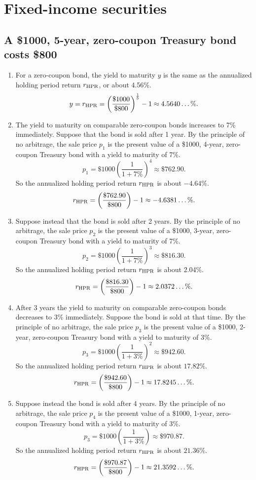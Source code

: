 \documentclass[12pt]{article}
\begin{document}
\section{Fixed-income securities}
\subsection{A \$1000, 5-year, zero-coupon Treasury bond costs \$800}
\begin{enumerate}
\item For a zero-coupon bond, the yield to maturity $y$ is the same as the annualized holding period return $r_{\rm HPR}$, or about 4.56\%. \[y=r_{\rm HPR}=\left(\frac{\$1000}{\$800}\right)^{\frac{1}{5}}-1\approx 4.5640\dots\%.\]
\item The yield to maturity on comparable zero-coupon bonds increases to 7\% immediately. Suppose that the bond is sold after 1 year. By the principle of no arbitrage, the sale price $p_1$ is the present value of a \$1000, 4-year, zero-coupon Treasury bond with a yield to maturity of 7\%. \[p_1=\$1000\left(\frac{1}{1+7\%}\right)^4\approx\$762.90.\] So the annualized holding period return $r_{\rm HPR}$ is about $-4.64\%$. \[r_{\rm HPR}=\left(\frac{\$762.90}{\$800}\right)-1\approx-4.6381\dots\%.\]
\item Suppose instead that the bond is sold after 2 years. By the principle of no arbitrage, the sale price $p_2$ is the present value of a \$1000, 3-year, zero-coupon Treasury bond with a yield to maturity of 7\%. \[p_2=\$1000\left(\frac{1}{1+7\%}\right)^3\approx\$816.30.\] So the annualized holding period return $r_{\rm HPR}$ is about 2.04\%. \[r_{\rm HPR}=\left(\frac{\$816.30}{\$800}\right)-1\approx 2.0372\dots\%.\]
\item After 3 years the yield to maturity on comparable zero-coupon bonds decreases to 3\% immediately. Suppose the bond is sold at that time. By the principle of no arbitrage, the sale price $p_3$ is the present value of a \$1000, 2-year, zero-coupon Treasury bond with a yield to maturity of 3\%. \[p_3=\$1000\left(\frac{1}{1+3\%}\right)^2\approx\$942.60.\] So the annualized holding period return $r_{\rm HPR}$ is about $17.82\%$. \[r_{\rm HPR}=\left(\frac{\$942.60}{\$800}\right)-1\approx 17.8245\dots\%.\]
\item Suppose instead the bond is sold after 4 years. By the principle of no arbitrage, the sale price $p_4$ is the present value of a \$1000, 1-year, zero-coupon Treasury bond with a yield to maturity of 3\%. \[p_3=\$1000\left(\frac{1}{1+3\%}\right)\approx\$970.87.\] So the annualized holding period return $r_{\rm HPR}$ is about $21.36\%$. \[r_{\rm HPR}=\left(\frac{\$970.87}{\$800}\right)-1\approx 21.3592\dots\%.\]

\end{enumerate}
\end{document}
